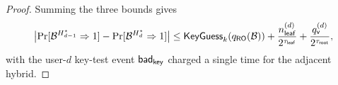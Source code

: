 \begin{proof}
Summing the three bounds gives
\[
  \bigl|\Pr[\mathcal{B}^{H_{d-1}^\star} \Rightarrow 1]
       - \Pr[\mathcal{B}^{H_d^\star} \Rightarrow 1]\bigr|
  \leq
  \mathsf{KeyGuess}_k(q_{\mathsf{RO}}(\mathcal{B}))
  + \frac{n_{\mathsf{leaf}}^{(d)}}{2^{\tau_{\mathsf{leaf}}}}
  + \frac{q_{\mathsf{v}}^{(d)}}{2^{\tau_{\mathsf{root}}}},
\]
with the user-$d$ key-test event $\mathsf{bad}_{\mathsf{key}}$ charged a single time for
the adjacent hybrid.
\end{proof}
